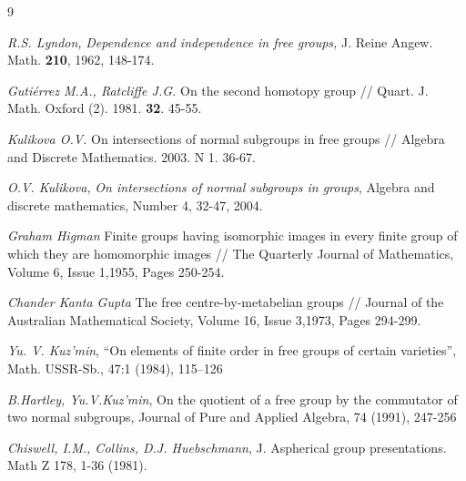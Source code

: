 \documentclass[12pt,reqno]{amsart}
\begin{document}
\begin{thebibliography}{9}






 { {\it R.S. Lyndon,} {\it
Dependence and independence in free groups,} J. Reine Angew. Math.
{\bf 210}, 1962, 148-174. }

 {{\it
Guti\'{e}rrez M.A., Ratcliffe J.G.}  On the second homotopy group
// Quart. J. Math. Oxford (2). 1981. {\bf 32}. 45-55.}

 {{\it Kulikova O.V.}  On intersections of normal
subgroups in free groups // Algebra and Discrete Mathematics.
2003. N 1. 36-67.}

 {{\it O.V. Kulikova,} {\it On intersections of normal
subgroups in groups}, Algebra and discrete mathematics, Number 4,
32-47, 2004.}

 {\it Graham Higman}
Finite groups having isomorphic images in every finite group of which they are homomorphic images // The Quarterly Journal of Mathematics, Volume 6, Issue 1,1955, Pages 250-254.


 {\it Chander Kanta Gupta}
The free centre-by-metabelian groups // Journal of the Australian Mathematical Society, Volume 16, Issue 3,1973, Pages 294-299.


 { {\it Yu. V. Kuz'min}, “On elements of finite order in free groups of certain varieties”, Math. USSR-Sb., 47:1 (1984), 115–126}

  {{\it B.Hartley, Yu.V.Kuz'min}, On the quotient of a free group by the commutator of two normal subgroups, Journal of Pure and Applied Algebra, 74 (1991), 247-256}



 {{\it Chiswell, I.M., Collins, D.J. Huebschmann}, J. Aspherical group presentations. Math Z 178, 1-36 (1981).}


\end{thebibliography}
\end{document}
